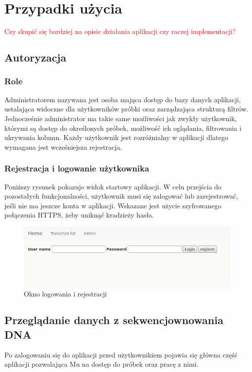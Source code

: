 \documentclass[a4paper,12pt,twoside]{article}
\begin{document}
\newpage
\section{Przypadki użycia}

\textcolor{red}{Czy skupić się bardziej na opisie działania aplikacji czy raczej implementacji?}
\subsection{Autoryzacja} 
\subsubsection{Role}
Administratorem nazywana jest osoba mająca dostęp do bazy danych aplikacji, ustalająca
widoczne dla użytkowników próbki oraz zarządzająca strukturą filtrów. 
Jednocześnie administrator ma takie same możliwości jak zwykły użytkownik, którymi są dostęp do określonych próbek, możliwość ich oglądania, filtrowania i  ukrywania kolumn. 
Każdy użytkownik jest rozróżnialny w aplikacji dlatego wymagana jest wcześniejsza rejestracja.
 
\subsubsection{Rejestracja i logowanie użytkownika}
Poniższy rysunek pokazuje widok startowy aplikacji. W celu przejścia do 
pozostałych funkcjonalności, użytkownik musi się zalogować lub zarejestrować, jeśli nie ma jeszcze 
konta w aplikacji. Wskazane jest użycie szyfrowanego połączenia HTTPS, żeby uniknąć 
kradzieży hasła.

\begin{figure}[h!]
  \includegraphics[width=\linewidth]{obrazy/aplikacja/login.png}
  \caption{Okno logowania i rejestracji}
  \label{fig:loginpic}
\end{figure}

\newpage  
\subsection{Przeglądanie danych z sekwencjownowania DNA}
Po zalogowaniu się do aplikacji przed użytkownikiem pojawia się główna część aplikacji pozwalająca Mu 
na dostęp do próbek oraz pracę z nimi. 
 
\end{document}
